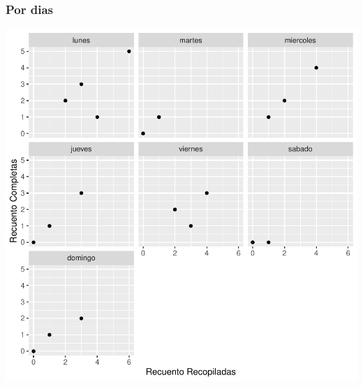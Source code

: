 \documentclass{article}
\begin{document}
\subsubsection{Por dias}

\includegraphics{seguimento2-098}
\end{document}
